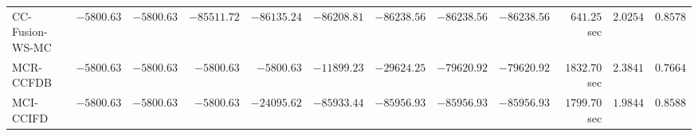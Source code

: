 \begin{table}[H]
\begin{tabular}{lrrrrrrrrrrr}
     CC-Fusion-WS-MC & $     -5800.63$ & $     -5800.63$ & $    -85511.72$ & $    -86135.24$ & $    -86208.81$ & $    -86238.56$ & $    -86238.56$ & $    -86238.56$ & $       641.25$ sec    & $       2.0254$  & $       0.8578$ \\ 
\cmidrule{1-1} 
           MCR-CCFDB & $     -5800.63$ & $     -5800.63$ & $     -5800.63$ & $     -5800.63$ & $    -11899.23$ & $    -29624.25$ & $    -79620.92$ & $    -79620.92$ & $      1832.70$ sec    & $       2.3841$  & $       0.7664$ \\ 
\cmidrule{1-1} 
           MCI-CCIFD & $     -5800.63$ & $     -5800.63$ & $     -5800.63$ & $    -24095.62$ & $    -85933.44$ & $    -85956.93$ & $    -85956.93$ & $    -85956.93$ & $      1799.70$ sec    & $       1.9844$  & $       0.8588$ \\ 
\bottomrule
\end{tabular}
\end{table}

